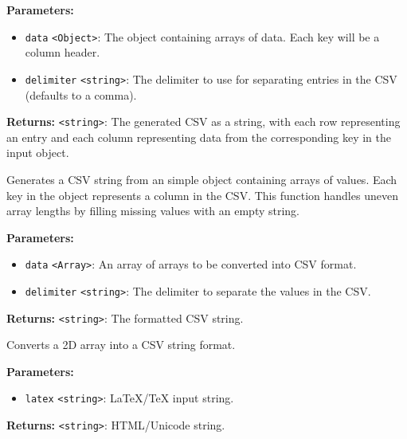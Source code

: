 \documentclass[12pt,a4paper]{article}
\begin{document}
\noindent \textbf{Parameters:}
\begin{itemize}
  \item \texttt{data} \texttt{<Object>}: The object containing arrays of data. Each key will be a column header.
  \item \texttt{delimiter} \texttt{<string>}: The delimiter to use for separating entries in the CSV (defaults to a comma).
\end{itemize}

\noindent \textbf{Returns:} \texttt{<string>}: The generated CSV as a string, with each row representing an entry and each column representing data from the corresponding key in the input object.

\noindent Generates a CSV string from an simple object containing arrays of values.
Each key in the object represents a column in the CSV. This function handles uneven array lengths by filling missing values with an empty string.

\vspace{5mm}
\noindent {}


\noindent \textbf{Parameters:}
\begin{itemize}
  \item \texttt{data} \texttt{<Array>}: An array of arrays to be converted into CSV format.
  \item \texttt{delimiter} \texttt{<string>}: The delimiter to separate the values in the CSV.
\end{itemize}

\noindent \textbf{Returns:} \texttt{<string>}: The formatted CSV string.

\noindent Converts a 2D array into a CSV string format.

\vspace{5mm}
\noindent {}


\noindent \textbf{Parameters:}
\begin{itemize}
  \item \texttt{latex} \texttt{<string>}: LaTeX/TeX input string.
\end{itemize}

\noindent \textbf{Returns:} \texttt{<string>}: HTML/Unicode string.
\end{document}
